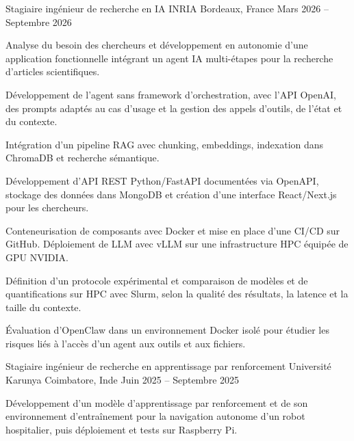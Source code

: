 
\begin{cventries}
  \cventry
    {Stagiaire ingénieur de recherche en IA}
    {INRIA}
    {Bordeaux, France}
    {Mars 2026 -- Septembre 2026}
    {
      \begin{cvitems}
        \item {Analyse du besoin des chercheurs et développement en autonomie d’une application fonctionnelle intégrant un agent IA multi-étapes pour la recherche d’articles scientifiques.}
        \item {Développement de l’agent sans framework d’orchestration, avec l’API OpenAI, des prompts adaptés au cas d’usage et la gestion des appels d’outils, de l’état et du contexte.}
        \item {Intégration d’un pipeline RAG avec chunking, embeddings, indexation dans ChromaDB et recherche sémantique.}
        \item {Développement d’API REST Python/FastAPI documentées via OpenAPI, stockage des données dans MongoDB et création d’une interface React/Next.js pour les chercheurs.}
        \item {Conteneurisation de composants avec Docker et mise en place d’une CI/CD sur GitHub. Déploiement de LLM avec vLLM sur une infrastructure HPC équipée de GPU NVIDIA.}
        \item {Définition d’un protocole expérimental et comparaison de modèles et de quantifications sur HPC avec Slurm, selon la qualité des résultats, la latence et la taille du contexte.}
        \item {Évaluation d’OpenClaw dans un environnement Docker isolé pour étudier les risques liés à l’accès d’un agent aux outils et aux fichiers.}
      \end{cvitems}
    }

  \cventry
    {Stagiaire ingénieur de recherche en apprentissage par renforcement}
    {Université Karunya}
    {Coimbatore, Inde}
    {Juin 2025 -- Septembre 2025}
    {
      \begin{cvitems}
        \item {Développement d’un modèle d’apprentissage par renforcement et de son environnement d’entraînement pour la navigation autonome d’un robot hospitalier, puis déploiement et tests sur Raspberry Pi.}
      \end{cvitems}
    }
\end{cventries}
